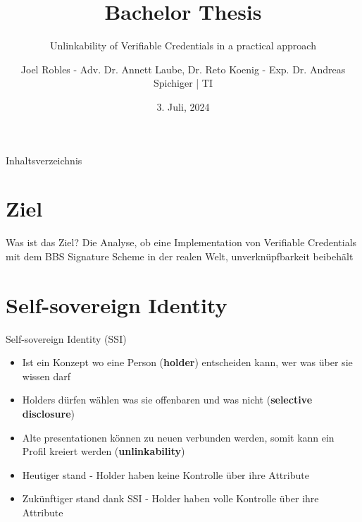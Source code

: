 \documentclass[
	german,%
	authorontitle=true,
	]{bfhbeamer}
\title{Bachelor Thesis}
\subtitle{Unlinkability of Verifiable Credentials in a practical approach}
\author[J. Robles]{Joel Robles - Adv. Dr. Annett Laube, Dr. Reto Koenig - Exp. Dr. Andreas Spichiger | TI}
\date{3. Juli, 2024}
\begin{document}
\maketitle

\begin{frame}{Inhaltsverzeichnis}
    \tableofcontents
\end{frame}

\section{Ziel}

\begin{frame}{Was ist das Ziel?}
    \centering
    Die Analyse, ob eine Implementation von Verifiable Credentials mit dem BBS Signature Scheme in der realen Welt, unverknüpfbarkeit beibehält
\end{frame}

\section{Self-sovereign Identity}

\begin{frame}{Self-sovereign Identity (SSI)}
    \begin{itemize}
        \item Ist ein Konzept wo eine Person (\textbf{holder}) entscheiden kann, wer was über sie wissen darf
        \item Holders dürfen wählen was sie offenbaren und was nicht (\textbf{selective disclosure})
        \item Alte presentationen können zu neuen verbunden werden, somit kann ein Profil kreiert werden (\textbf{unlinkability})
        \item Heutiger stand - Holder haben keine Kontrolle über ihre Attribute
        \item Zukünftiger stand dank SSI - Holder haben volle Kontrolle über ihre Attribute
    \end{itemize}
\end{frame}
\end{document}
